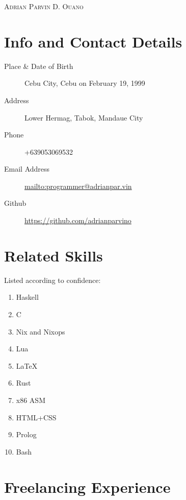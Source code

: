 \documentclass{article}
\author{Adrian Parvin D. Ouano}
\begin{document}



\begin {center}
  \Huge \scshape Adrian Parvin D. Ouano
\end {center}

\hrulefill
\section*{Info and Contact Details}

\begin{description} \item [Place \& Date of Birth] Cebu City, Cebu on February 19, 1999
\item [Address] Lower Hermag, Tabok, Mandaue City
\item [Phone] +639053069532
\item [Email Address] \href{mailto:programmer@adrianpar.vin}{mailto:programmer@adrianpar.vin}
\item [Github] \href{https://github.com/adrianparvino}{https://github.com/adrianparvino}
\end{description}

\hrulefill
\section*{Related Skills}

Listed according to confidence:

\begin{multicols}{2}
\begin {enumerate}
\item Haskell
\item C
\item Nix and Nixops
\item Lua
\item \LaTeX
\item Rust
\item x86 ASM
\item HTML+CSS
\item Prolog
\item Bash
\end {enumerate}
\end{multicols}

\hrulefill
\section*{Freelancing Experience}
\end{document}
